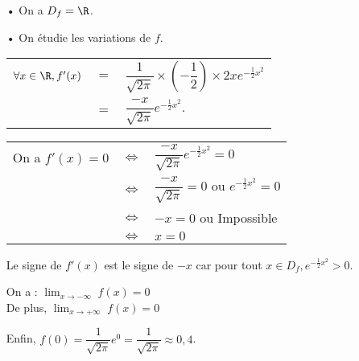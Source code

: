 \begin{itemize}
\item[•] On a $D_{f} = \R$. 

\item[•] On étudie les variations de $f$. \\

\vspace*{.3cm}

\begin{tabular}{lll}
\hspace*{-.3cm} $\forall x \in \R, f'(x)$ & $=$ & $\dfrac{1}{\sqrt{2\pi}} \times \left(-\dfrac{1}{2}\right) \times 2xe^{-\frac{1}{2}x^2}$ \vspace*{.3cm} \\
& $=$ & $\dfrac{-x}{\sqrt{2\pi}}e^{-\frac{1}{2}x^2}$.
\end{tabular}

\vspace*{.3cm}

\begin{tabular}{lll}
\hspace{-.3cm} On a $f'(x) = 0$ & $\Longleftrightarrow$ & $\dfrac{-x}{\sqrt{2\pi}}e^{-\frac{1}{2}x^2} = 0$ \vspace*{.3cm} \\
& $\Longleftrightarrow$ & $\dfrac{-x}{\sqrt{2\pi}} = 0$ ou $e^{-\frac{1}{2}x^2} = 0$ \vspace*{.3cm} \\
& $\Longleftrightarrow$ & $-x = 0$ ou Impossible \vspace*{.3cm} \\
& $\Longleftrightarrow$ & $x=0$ \\
\end{tabular}

\vspace*{.3cm}

Le signe de $f'(x)$ est le signe de $-x$ car pour tout $x \in D_f, e^{-\frac{1}{2}x^2}>0$. \\

\vspace*{.3cm}

On a : $ \displaystyle {\lim_{x \rightarrow -\infty}} \; f(x) = 0$ \\

De plus, $ \displaystyle {\lim_{x \rightarrow +\infty}} \; f(x) = 0$

\vspace*{.3cm}

Enfin, $f(0) = \dfrac{1}{\sqrt{2\pi}}e^0 = \dfrac{1}{\sqrt{2\pi}} \approx 0,4$. \\


\end{itemize}
